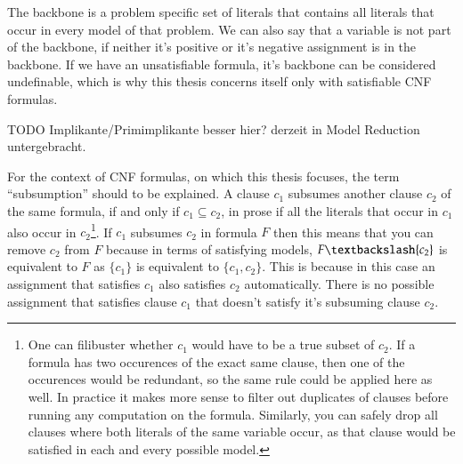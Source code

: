 The backbone is a problem specific set of literals that contains all literals that occur in every model of that problem. We can also say that a variable is not part of the backbone, if neither it's positive or it's negative assignment is in the backbone. If we have an unsatisfiable formula, it's backbone can be considered undefinable, which is why this thesis concerns itself only with satisfiable CNF formulas.

TODO Implikante/Primimplikante besser hier? derzeit in Model Reduction untergebracht. 


For the context of CNF formulas, on which this thesis focuses, the term ``subsumption'' should to be explained. A clause $c_1$ subsumes another clause $c_2$ of the same formula, if and only if $c_1 \subseteq c_2$, in prose if all the literals that occur in $c_1$ also occur in $c_2$\footnote{
	One can filibuster whether $c_1$ would have to be a true subset of $c_2$. If a formula has two occurences of the exact same clause, then one of the occurences would be redundant, so the same rule could be applied here as well. In practice it makes more sense to filter out duplicates of clauses before running any computation on the formula. Similarly, you can safely drop all clauses where both literals of the same variable occur, as that clause would be satisfied in each and every possible model.}.
If $c_1$ subsumes $c_2$ in formula $F$ then this means that you can remove $c_2$ from $F$ because in terms of satisfying models, $F\textbackslash \{c_2\}$ is equivalent to $F$ as $\{c_1\}$ is equivalent to $\{c_1,c_2\}$. This is because in this case an assignment that satisfies $c_1$ also satisfies $c_2$ automatically. There is no possible assignment that satisfies clause $c_1$ that doesn't satisfy it's subsuming clause $c_2$.